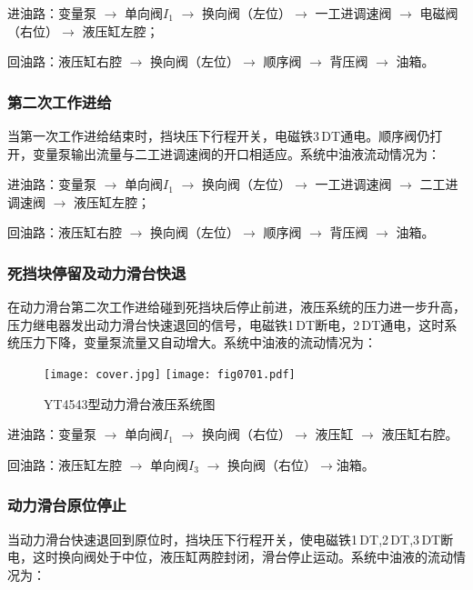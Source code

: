 进油路：变量泵 $\rightarrow$ 单向阀$I_{1}$ $\rightarrow$ 换向阀（左位）$\rightarrow$ 一工进调速阀 $\rightarrow$ 电磁阀（右位）$\rightarrow$ 液压缸左腔；

回油路：液压缸右腔 $\rightarrow$ 换向阀（左位）$\rightarrow$ 顺序阀 $\rightarrow$ 背压阀 $\rightarrow$ 油箱。

\subsubsection {第二次工作进给}

当第一次工作进给结束时，挡块压下行程开关，电磁铁3\,DT通电。顺序阀仍打开，变量泵输出流量与二工进调速阀的开口相适应。系统中油液流动情况为：

进油路：变量泵 $\rightarrow$ 单向阀$I_{1}$ $\rightarrow$ 换向阀（左位）$\rightarrow$ 一工进调速阀 $\rightarrow$ 二工进调速阀 $\rightarrow$ 液压缸左腔；

回油路：液压缸右腔 $\rightarrow$ 换向阀（左位）$\rightarrow$ 顺序阀 $\rightarrow$ 背压阀 $\rightarrow$ 油箱。

\subsubsection {死挡块停留及动力滑台快退}

在动力滑台第二次工作进给碰到死挡块后停止前进，液压系统的压力进一步升高，压力继电器发出动力滑台快速退回的信号，电磁铁1\,DT断电，2\,DT通电，这时系统压力下降，变量泵流量又自动增大。系统中油液的流动情况为：

\begin{figure}[!hbt]
\centering
\ifOpenSource
\texttt{[image: cover.jpg]}
\else
\texttt{[image: fig0701.pdf]}
\fi
\caption{YT4543型动力滑台液压系统图}
\label{fig:fig0701}
\end{figure}
 
进油路：变量泵 $\rightarrow$ 单向阀$I_{1}$ $\rightarrow$ 换向阀（右位）$\rightarrow$ 液压缸 $\rightarrow$ 液压缸右腔。

回油路：液压缸左腔 $\rightarrow$ 单向阀$I_{3}$ $\rightarrow$ 换向阀（右位）$\rightarrow$油箱。

\subsubsection {动力滑台原位停止}

当动力滑台快速退回到原位时，挡块压下行程开关，使电磁铁1\,DT,2\,DT,3\,DT断电，这时换向阀处于中位，液压缸两腔封闭，滑台停止运动。系统中油液的流动情况为：

